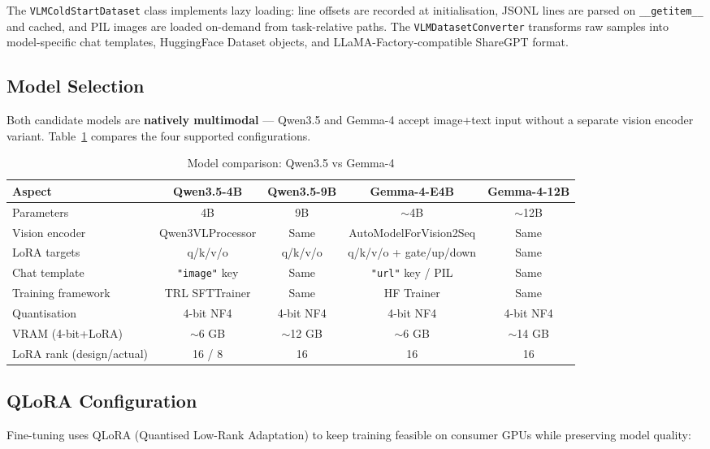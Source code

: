 \documentclass[11pt,a4paper]{article}
\begin{document}
The \texttt{VLMColdStartDataset} class implements lazy loading: line offsets are recorded at initialisation, JSONL lines are parsed on \texttt{\_\_getitem\_\_} and cached, and PIL images are loaded on-demand from task-relative paths. The \texttt{VLMDatasetConverter} transforms raw samples into model-specific chat templates, HuggingFace Dataset objects, and LLaMA-Factory-compatible ShareGPT format.

\subsection{Model Selection}

Both candidate models are \textbf{natively multimodal} — Qwen3.5 and Gemma-4 accept image+text input without a separate vision encoder variant. Table~\ref{tab:models} compares the four supported configurations.

\begin{table}[H]
\centering
\caption{Model comparison: Qwen3.5 vs Gemma-4}
\label{tab:models}
\begin{tabular}{@{}lcccc@{}}
\toprule
\textbf{Aspect} & \textbf{Qwen3.5-4B} & \textbf{Qwen3.5-9B} & \textbf{Gemma-4-E4B} & \textbf{Gemma-4-12B} \\
\midrule
Parameters & 4B & 9B & $\sim$4B & $\sim$12B \\
Vision encoder & Qwen3VLProcessor & Same & AutoModelForVision2Seq & Same \\
LoRA targets & q/k/v/o & q/k/v/o & q/k/v/o + gate/up/down & Same \\
Chat template & \texttt{"image"} key & Same & \texttt{"url"} key / PIL & Same \\
Training framework & TRL SFTTrainer & Same & HF Trainer & Same \\
Quantisation & 4-bit NF4 & 4-bit NF4 & 4-bit NF4 & 4-bit NF4 \\
VRAM (4-bit+LoRA) & $\sim$6 GB & $\sim$12 GB & $\sim$6 GB & $\sim$14 GB \\
LoRA rank (design/actual) & 16 / 8 & 16 & 16 & 16 \\
\bottomrule
\end{tabular}
\end{table}

\subsection{QLoRA Configuration}

Fine-tuning uses QLoRA (Quantised Low-Rank Adaptation) to keep training feasible on consumer GPUs while preserving model quality:
\end{document}
